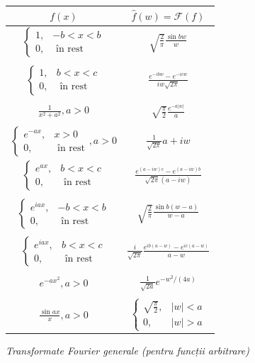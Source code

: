 \documentclass[12pt,a4paper]{article}
\newcommand\kal{\mathcal}
\theoremstyle{dotless}
\theoremstyle{dotlessdr}
\begin{document}
\newpage

\begin{figure}[!htbp]
  \centering
  \begin{tabular}{c|c}
    $ f(x) $ & $ \widehat{f}(w) = \kal{F}(f) $ \\
    \hline\hline
    $ \begin{cases} 1, & -b < x < b \\ 0, &\text{ în rest} \end{cases} $ & $ \sqrt{\frac{2}{\pi}} \frac{\sin bw}{w} $ \\
             & \\
    $ \begin{cases} 1, & b < x < c \\ 0, &\text{ în rest} \end{cases} $ & $ \frac{e^{-ibw} - e^{-icw}}{iw \sqrt{2\pi}} $ \\
             & \\
    $ \frac{1}{x^2 + a^2}, a > 0 $ & $ \sqrt{\frac{\pi}{2}} \frac{e^{-a|w|}}{a} $ \\
             & \\
    $ \begin{cases} e^{-ax}, & x > 0 \\ 0, &\text{ în rest} \end{cases}, a > 0 $ & $ \frac{1}{\sqrt{2\pi}}{a + iw} $ \\
    $ \begin{cases} e^{ax}, & b < x < c \\ 0, &\text{ în rest} \end{cases} $ & $ \frac{e^{(a-iw)c} - e^{(a - iw)b}}{\sqrt{2\pi}(a - iw)} $ \\
             & \\
    $ \begin{cases} e^{iax}, & -b < x < b \\ 0, &\text{ în rest} \end{cases} $ & $ \sqrt{\frac{2}{\pi}} \frac{\sin b(w - a)}{w - a} $ \\
             & \\
    $ \begin{cases} e^{iax}, & b < x < c \\ 0, &\text{ în rest} \end{cases} $ & $ \frac{i}{\sqrt{2\pi}} \frac{e^{ib(a - w)} - e^{ic(a - w)}}{a - w} $ \\
             & \\
    $ e^{-ax^2}, a > 0 $ & $ \frac{1}{\sqrt{2a}} e^{-w^2/(4a)} $ \\
             & \\
    $ \frac{\sin ax}{x}, a > 0 $ & $ \begin{cases} \sqrt{\frac{\pi}{2}}, & |w| < a \\ 0, & |w| > a \end{cases} $
  \end{tabular}
  \caption{\emph{Transformate Fourier generale (pentru funcții arbitrare)}}
\end{figure}
\end{document}
